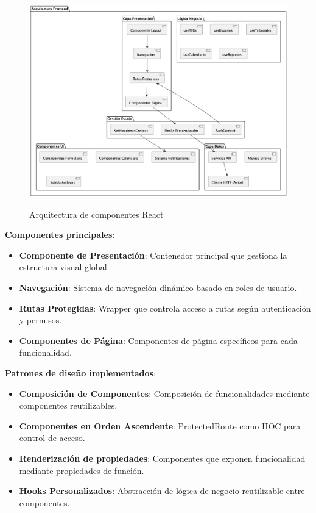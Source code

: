 \documentclass[12pt,a4paper,oneside]{report}
\providecommand{\tightlist}{%
  \setlength{\itemsep}{0pt}\setlength{\parskip}{0pt}}
\providecommand{\pandocbounded}[1]{#1}
\begin{document}
\begin{figure}[H]
\centering
\pandocbounded{\includegraphics[keepaspectratio,alt={Arquitectura de componentes React}]{processed/images/05_diseno_plantuml_0.png}}
\caption{Arquitectura de componentes React}
\label{fig:arquitectura-componentes-react}
\end{figure}

\textbf{Componentes principales}:

\begin{itemize}
\tightlist
\item
  \textbf{Componente de Presentación}: Contenedor principal que gestiona la
  estructura visual global.
\item
  \textbf{Navegación}: Sistema de navegación dinámico basado en roles de
  usuario.
\item
  \textbf{Rutas Protegidas}: Wrapper que controla acceso a rutas según
  autenticación y permisos.
\item
  \textbf{Componentes de Página}: Componentes de página específicos para cada
  funcionalidad.
\end{itemize}

\textbf{Patrones de diseño implementados}:

\begin{itemize}
\tightlist
\item
  \textbf{Composición de Componentes}: Composición de funcionalidades
  mediante componentes reutilizables.
\item
  \textbf{Componentes en Orden Ascendente}: ProtectedRoute como HOC para control
  de acceso.
\item
  \textbf{Renderización de propiedades}: Componentes que exponen funcionalidad mediante
  propiedades de función.
\item
  \textbf{Hooks Personalizados}: Abstracción de lógica de negocio reutilizable
  entre componentes.
\end{itemize}
\end{document}
